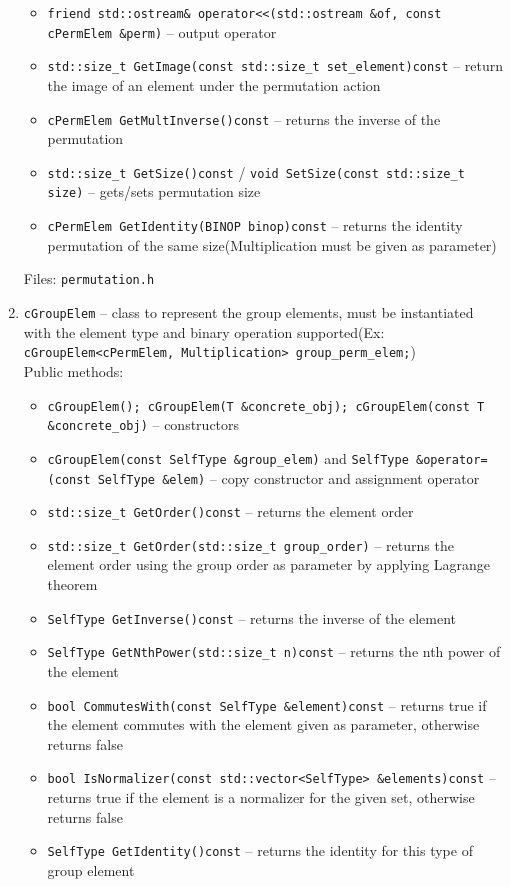 \documentclass[a4paper,11pt]{article}
\begin{document}
\begin{enumerate}
\begin{itemize}
\item
\verb=friend std::ostream& operator<<(std::ostream &of, const cPermElem &perm)= -- output operator
\item
\verb=std::size_t GetImage(const std::size_t set_element)const= -- return the image of an element under the permutation action
\item
\verb=cPermElem GetMultInverse()const= -- returns the inverse of the permutation
\item
\verb=std::size_t GetSize()const= / \verb=void SetSize(const std::size_t size)= -- gets/sets permutation size
\item
\verb=cPermElem GetIdentity(BINOP binop)const= -- returns the identity permutation of the same size(Multiplication must be given as parameter)
\end{itemize}
Files: \verb=permutation.h=
\item
\verb=cGroupElem= -- class to represent the group elements, must be instantiated with the element type and binary operation supported(Ex: \verb=cGroupElem<cPermElem, Multiplication> group_perm_elem;=)\\
Public methods:
\begin{itemize}
\item
\verb=cGroupElem(); cGroupElem(T &concrete_obj); cGroupElem(const T &concrete_obj)= -- constructors
\item
\verb=cGroupElem(const SelfType &group_elem)= and \verb+SelfType &operator=(const SelfType &elem)+ -- copy constructor and assignment operator
\item
\verb=std::size_t GetOrder()const= -- returns the element order
\item
\verb=std::size_t GetOrder(std::size_t group_order)= -- returns the element order using the group order as parameter by applying Lagrange theorem
\item
\verb=SelfType GetInverse()const= -- returns the inverse of the element
\item
\verb=SelfType GetNthPower(std::size_t n)const= -- returns the nth power of the element
\item
\verb=bool CommutesWith(const SelfType &element)const= -- returns true if the element commutes with the element given as parameter, otherwise returns false
\item
\verb=bool IsNormalizer(const std::vector<SelfType> &elements)const= -- returns true if the element is a normalizer for the given set, otherwise returns false
\item
\verb=SelfType GetIdentity()const= -- returns the identity for this type of group element

\end{itemize}
\end{enumerate}
\end{document}
